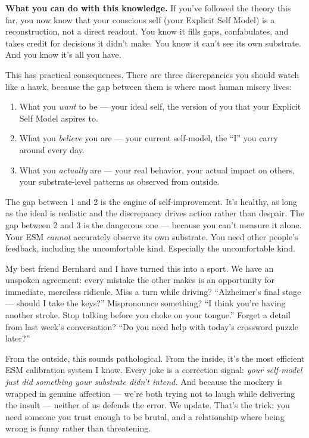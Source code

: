 \documentclass[11pt, twoside, openright]{book}
\begin{document}
\textbf{What you can do with this knowledge.} If you've followed the theory this far, you now know that your conscious self (your Explicit Self Model) is a reconstruction, not a direct readout. You know it fills gaps, confabulates, and takes credit for decisions it didn't make. You know it can't see its own substrate. And you know it's all you have.

This has practical consequences. There are three discrepancies you should watch like a hawk, because the gap between them is where most human misery lives:

\begin{enumerate}
  \item What you \textit{want} to be --- your ideal self, the version of you that your Explicit Self Model aspires to.
  \item What you \textit{believe} you are --- your current self-model, the ``I'' you carry around every day.
  \item What you \textit{actually} are --- your real behavior, your actual impact on others, your substrate-level patterns as observed from outside.
\end{enumerate}

The gap between 1 and 2 is the engine of self-improvement. It's healthy, as long as the ideal is realistic and the discrepancy drives action rather than despair. The gap between 2 and 3 is the dangerous one --- because you can't measure it alone. Your ESM \textit{cannot} accurately observe its own substrate. You need other people's feedback, including the uncomfortable kind. Especially the uncomfortable kind.

My best friend Bernhard and I have turned this into a sport. We have an unspoken agreement: every mistake the other makes is an opportunity for immediate, merciless ridicule. Miss a turn while driving? ``Alzheimer's final stage --- should I take the keys?'' Mispronounce something? ``I think you're having another stroke. Stop talking before you choke on your tongue.'' Forget a detail from last week's conversation? ``Do you need help with today's crossword puzzle later?''

From the outside, this sounds pathological. From the inside, it's the most efficient ESM calibration system I know. Every joke is a correction signal: \textit{your self-model just did something your substrate didn't intend.} And because the mockery is wrapped in genuine affection --- we're both trying not to laugh while delivering the insult --- neither of us defends the error. We update. That's the trick: you need someone you trust enough to be brutal, and a relationship where being wrong is funny rather than threatening.
\end{document}
